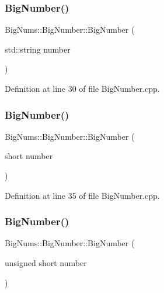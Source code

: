 \subsubsection{\texorpdfstring{BigNumber()}{BigNumber()}\hspace{0.1cm}{\footnotesize\ttfamily [5/16]}}
{\footnotesize\ttfamily Big\+Nums\+::\+Big\+Number\+::\+Big\+Number (\begin{DoxyParamCaption}\item[{std\+::string}]{number }\end{DoxyParamCaption})\hspace{0.3cm}{\ttfamily [explicit]}}



Definition at line 30 of file Big\+Number.\+cpp.

\mbox{\label{class_big_nums_1_1_big_number_a10c73e0ca7d565c7f50907d88e653fcc}} 
\subsubsection{\texorpdfstring{BigNumber()}{BigNumber()}\hspace{0.1cm}{\footnotesize\ttfamily [6/16]}}
{\footnotesize\ttfamily Big\+Nums\+::\+Big\+Number\+::\+Big\+Number (\begin{DoxyParamCaption}\item[{short}]{number }\end{DoxyParamCaption})\hspace{0.3cm}{\ttfamily [explicit]}}



Definition at line 35 of file Big\+Number.\+cpp.

\mbox{\label{class_big_nums_1_1_big_number_a7ffb48df9f893148c553a4ffba013bd5}} 
\subsubsection{\texorpdfstring{BigNumber()}{BigNumber()}\hspace{0.1cm}{\footnotesize\ttfamily [7/16]}}
{\footnotesize\ttfamily Big\+Nums\+::\+Big\+Number\+::\+Big\+Number (\begin{DoxyParamCaption}\item[{unsigned short}]{number }\end{DoxyParamCaption})\hspace{0.3cm}{\ttfamily [explicit]}}



